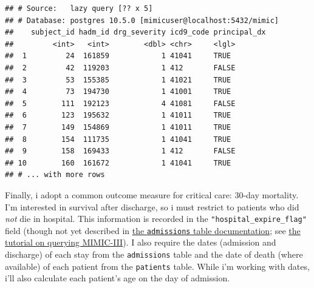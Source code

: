 \documentclass[]{article}
\newenvironment{Shaded}{\begin{snugshade}}{\end{snugshade}}
\newcommand{\KeywordTok}[1]{\textcolor[rgb]{0.13,0.29,0.53}{\textbf{#1}}}
\newcommand{\DataTypeTok}[1]{\textcolor[rgb]{0.13,0.29,0.53}{#1}}
\newcommand{\DecValTok}[1]{\textcolor[rgb]{0.00,0.00,0.81}{#1}}
\newcommand{\StringTok}[1]{\textcolor[rgb]{0.31,0.60,0.02}{#1}}
\newcommand{\OperatorTok}[1]{\textcolor[rgb]{0.81,0.36,0.00}{\textbf{#1}}}
\newcommand{\NormalTok}[1]{#1}
\begin{document}
\begin{Shaded}
\end{Shaded}

\begin{verbatim}
## # Source:   lazy query [?? x 5]
## # Database: postgres 10.5.0 [mimicuser@localhost:5432/mimic]
##    subject_id hadm_id drg_severity icd9_code principal_dx
##         <int>   <int>        <dbl> <chr>     <lgl>       
##  1         24  161859            1 41041     TRUE        
##  2         42  119203            1 412       FALSE       
##  3         53  155385            1 41021     TRUE        
##  4         73  194730            1 41001     TRUE        
##  5        111  192123            4 41081     FALSE       
##  6        123  195632            1 41011     TRUE        
##  7        149  154869            1 41011     TRUE        
##  8        154  111735            1 41041     TRUE        
##  9        158  169433            1 412       FALSE       
## 10        160  161672            1 41041     TRUE        
## # ... with more rows
\end{verbatim}

Finally, i adopt a common outcome measure for critical care: 30-day
mortality. I'm interested in survival after discharge, so i must
restrict to patients who did \emph{not} die in hospital. This
information is recorded in the \texttt{"hospital\_expire\_flag"} field
(though not yet described in
\href{https://mimic.mit.edu/docs/III/tables/admissions.html}{the
\texttt{admissions} table documentation}; see
\href{https://github.com/MIT-LCP/mimic-code/blob/main/mimic-iii/tutorials/sql-intro.md}{the
tutorial on querying MIMIC-III}). I also require the dates (admission
and discharge) of each stay from the \texttt{admissions} table and the
date of death (where available) of each patient from the
\texttt{patients} table. While i'm working with dates, i'll also
calculate each patient's age on the day of admission.
\end{document}
